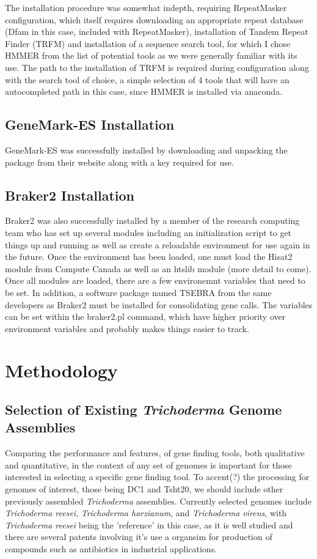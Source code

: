 \documentclass[12pt]{article}
\begin{document}
The installation procedure was somewhat indepth, requiring
RepeatMasker configuration, which itself requires downloading an
appropriate repeat database (Dfam in this case, included with
RepeatMasker), installation of Tandem Repeat Finder (TRFM) and
installation of a sequence search tool, for which I chose HMMER from
the list of potential tools as we were generally familiar with its
use. The path to the installation of TRFM is required during
configuration along with the search tool of choice, a simple selection
of 4 tools that will have an autocompleted path in this case, since
HMMER is installed via anaconda.

\subsection{GeneMark-ES Installation}
GeneMark-ES was successfully installed by downloading and unpacking
the package from their website along with a key required for use.

\subsection{Braker2 Installation}
Braker2 was also successfully installed by a member of the research
computing team who has set up several modules including an
initialization script to get things up and running as well as create a
reloadable environment for use again in the future. Once the
environment has been loaded, one must load the Hisat2 module from
Compute Canada as well as an htslib module (more detail to come). Once
all modules are loaded, there are a few environemnt variables that
need to be set. In addition, a software package named TSEBRA from the
same developers as Braker2 must be installed for consolidating gene
calls. The variables can be set within the braker2.pl command, which
have higher priority over environment variables and probably makes
things easier to track.

\section{Methodology}

\subsection{Selection of Existing \textit{Trichoderma} Genome Assemblies}

Comparing the performance and features, of gene finding tools, both
qualitative and quantitative, in the context of any set of genomes is
important for those interested in selecting a specific gene finding
tool. To accent(?) the processing for genomes of interest, those being
DC1 and Tsht20, we should include other previously assembled
\textit{Trichoderma} assemblies. Currently selected genomes include
\textit{Trichoderma reesei}, \textit{Trichoderma harzianum}, and
\textit{Trichoderma virens}, with \textit{Trichoderma reesei} being
the 'reference' in this case, as it is well studied and there are
several patents involving it's use a organsim for production of
compounds such as antibiotics in industrial applications.
\end{document}
